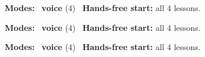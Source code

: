 \expandafter\def\csname hlchaptermodality24\endcsname{%
  {\small\noindent
    \textbf{Modes:} \hlvoicesign{}~\textbf{voice} (4)\quad
    \hlvoicesign{}~\textbf{Hands-free start:} all 4 lessons.%
    \par}\medskip
}

\expandafter\def\csname hlchaptermodality25\endcsname{%
  {\small\noindent
    \textbf{Modes:} \hlvoicesign{}~\textbf{voice} (4)\quad
    \hlvoicesign{}~\textbf{Hands-free start:} all 4 lessons.%
    \par}\medskip
}

\expandafter\def\csname hlchaptermodality26\endcsname{%
  {\small\noindent
    \textbf{Modes:} \hlvoicesign{}~\textbf{voice} (4)\quad
    \hlvoicesign{}~\textbf{Hands-free start:} all 4 lessons.%
    \par}\medskip
}
